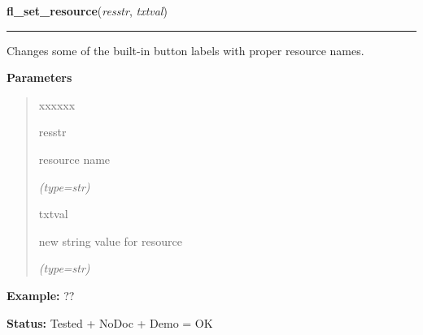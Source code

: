 \hspace{.8\funcindent}\begin{boxedminipage}{\funcwidth}

    \raggedright \textbf{fl\_set\_resource}(\textit{resstr}, \textit{txtval})

    \vspace{-1.5ex}

    \rule{\textwidth}{0.5\fboxrule}
\setlength{\parskip}{2ex}
    Changes some of the built-in button labels with proper resource names.

\setlength{\parskip}{1ex}
      \textbf{Parameters}
      \vspace{-1ex}

      \begin{quote}
        \begin{Ventry}{xxxxxx}

          \item[resstr]

          resource name

            {\it (type=str)}

          \item[txtval]

          new string value for resource

            {\it (type=str)}

        \end{Ventry}

      \end{quote}

\textbf{Example:} ??



\textbf{Status:} Tested + NoDoc + Demo = OK



    \end{boxedminipage}

    \label{xformslib:flxbasic:fl_get_app_resources}

    \vspace{0.5ex}

